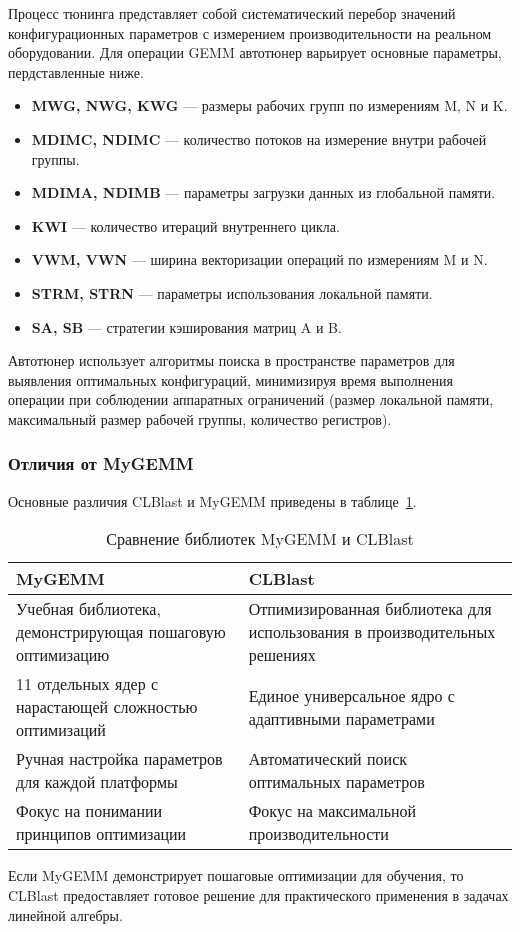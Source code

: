 Процесс тюнинга представляет собой систематический перебор значений конфигурационных параметров с измерением производительности на реальном оборудовании. Для операции GEMM автотюнер варьирует основные параметры, пердставленные ниже.

\begin{itemize}
    \item \textbf{MWG, NWG, KWG} --- размеры рабочих групп по измерениям M, N и K.
    \item \textbf{MDIMC, NDIMC} --- количество потоков на измерение внутри рабочей группы.
    \item \textbf{MDIMA, NDIMB} --- параметры загрузки данных из глобальной памяти.
    \item \textbf{KWI} --- количество итераций внутреннего цикла.
    \item \textbf{VWM, VWN} --- ширина векторизации операций по измерениям M и N.
    \item \textbf{STRM, STRN} --- параметры использования локальной памяти.
    \item \textbf{SA, SB} --- стратегии кэширования матриц A и B.
\end{itemize}

Автотюнер использует алгоритмы поиска в пространстве параметров для выявления оптимальных конфигураций, минимизируя время выполнения операции при соблюдении аппаратных ограничений (размер локальной памяти, максимальный размер рабочей группы, количество регистров).

\subsubsection{Отличия от MyGEMM}

Основные различия CLBlast и MyGEMM приведены в таблице~\ref{tab:mygemm_vs_clblast}.

\begin{table}[h]
\centering
\caption{Сравнение библиотек MyGEMM и CLBlast}
\label{tab:mygemm_vs_clblast}
\begin{tabular}{p{}p{}}
\hline
\textbf{MyGEMM} & \textbf{CLBlast} \\
\hline
Учебная библиотека, демонстрирующая пошаговую оптимизацию & Отпимизированная библиотека для использования в производительных решениях \\
\hline
11 отдельных ядер с нарастающей сложностью оптимизаций & Единое универсальное ядро с адаптивными параметрами \\
\hline
Ручная настройка параметров для каждой платформы & Автоматический поиск оптимальных параметров \\
\hline
Фокус на понимании принципов оптимизации & Фокус на максимальной производительности \\
\hline
\end{tabular}
\end{table}

Если MyGEMM демонстрирует пошаговые оптимизации для обучения, то CLBlast предоставляет готовое решение для практического применения в задачах линейной алгебры.